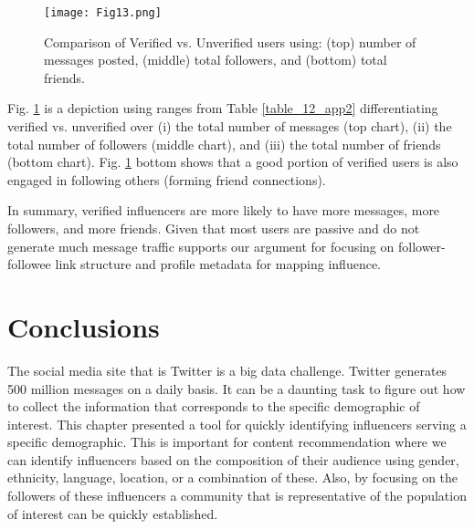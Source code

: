 \begin{figure}[htbp]
\centerline{\texttt{[image: Fig13.png]}}
\caption[Verified vs. Unverified users]{Comparison of Verified vs. Unverified users using: (top) number of messages posted, (middle) total followers, and (bottom) total friends.}
\label{fig_ch7_7}
\end{figure}

Fig. \ref{fig_ch7_7} is a depiction using ranges from Table \ref{table_12_app2} differentiating verified vs. unverified over (i) the total number of messages (top chart), (ii) the total number of followers (middle chart), and (iii) the total number of friends (bottom chart). Fig. \ref{fig_ch7_7} bottom shows that a good portion of verified users is also engaged in following others (forming friend connections).

In summary, verified influencers are more likely to have more messages, more followers, and more friends. Given that most users are passive and do not generate much message traffic supports our argument for focusing on follower-followee link structure and profile metadata for mapping influence.

\section{Conclusions}
The social media site that is Twitter is a big data challenge. Twitter generates 500 million messages on a daily basis. It can be a daunting task to figure out how to collect the information that corresponds to the specific demographic of interest. This chapter presented a tool for quickly identifying influencers serving a specific demographic. This is important for content recommendation where we can identify influencers based on the composition of their audience using gender, ethnicity, language, location, or a combination of these. Also, by focusing on the followers of these influencers a community that is representative of the population of interest can be quickly established.

